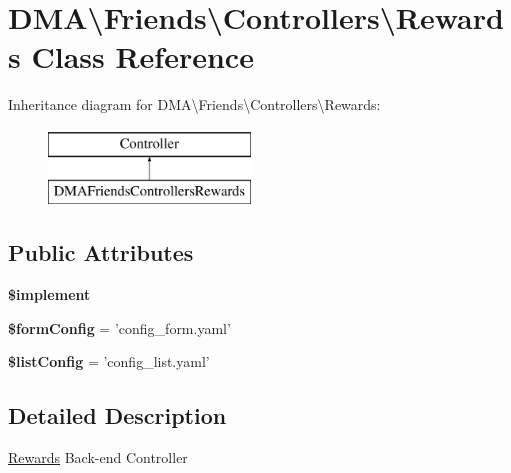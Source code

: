 \hypertarget{classDMA_1_1Friends_1_1Controllers_1_1Rewards}{\section{D\-M\-A\textbackslash{}Friends\textbackslash{}Controllers\textbackslash{}Rewards Class Reference}
\label{classDMA_1_1Friends_1_1Controllers_1_1Rewards}
}
Inheritance diagram for D\-M\-A\textbackslash{}Friends\textbackslash{}Controllers\textbackslash{}Rewards\-:\begin{figure}[H]
\begin{center}
\leavevmode
\includegraphics[height=2.000000cm]{d2/dab/classDMA_1_1Friends_1_1Controllers_1_1Rewards}
\end{center}
\end{figure}
\subsection*{Public Attributes}
\begin{DoxyCompactItemize}
\item 
{\bfseries \$implement}
\item 
\hypertarget{classDMA_1_1Friends_1_1Controllers_1_1Rewards_a9522421e338fbc2e218588583b5fb9a7}{{\bfseries \$form\-Config} = 'config\-\_\-form.\-yaml'}\label{classDMA_1_1Friends_1_1Controllers_1_1Rewards_a9522421e338fbc2e218588583b5fb9a7}

\item 
\hypertarget{classDMA_1_1Friends_1_1Controllers_1_1Rewards_a887be4eff98a60ac76c7c06e4513430a}{{\bfseries \$list\-Config} = 'config\-\_\-list.\-yaml'}\label{classDMA_1_1Friends_1_1Controllers_1_1Rewards_a887be4eff98a60ac76c7c06e4513430a}

\end{DoxyCompactItemize}


\subsection{Detailed Description}
\hyperlink{classDMA_1_1Friends_1_1Controllers_1_1Rewards}{Rewards} Back-\/end Controller 

